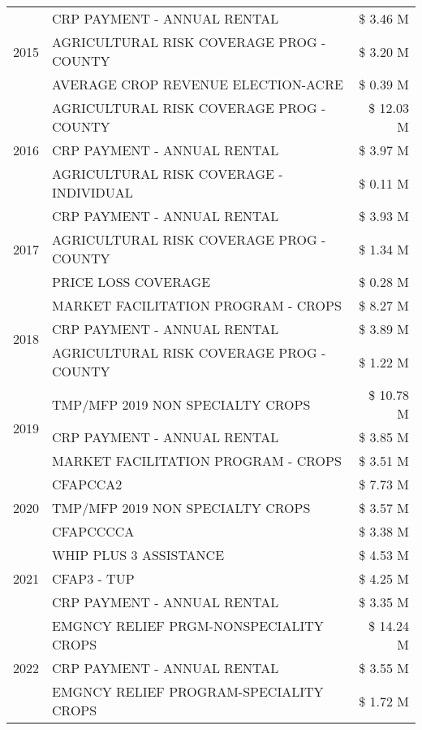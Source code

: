 \begin{tabular}{llr}
\cline{1-3}
\multirow[t]{3}{*}{2015} & CRP PAYMENT - ANNUAL RENTAL & \$ 3.46 M \\
 & AGRICULTURAL RISK COVERAGE PROG - COUNTY & \$ 3.20 M \\
 & AVERAGE CROP REVENUE ELECTION-ACRE & \$ 0.39 M \\
\cline{1-3}
\multirow[t]{3}{*}{2016} & AGRICULTURAL RISK COVERAGE PROG - COUNTY & \$ 12.03 M \\
 & CRP PAYMENT - ANNUAL RENTAL & \$ 3.97 M \\
 & AGRICULTURAL RISK COVERAGE - INDIVIDUAL & \$ 0.11 M \\
\cline{1-3}
\multirow[t]{3}{*}{2017} & CRP PAYMENT - ANNUAL RENTAL & \$ 3.93 M \\
 & AGRICULTURAL RISK COVERAGE PROG - COUNTY & \$ 1.34 M \\
 & PRICE LOSS COVERAGE & \$ 0.28 M \\
\cline{1-3}
\multirow[t]{3}{*}{2018} & MARKET FACILITATION PROGRAM - CROPS & \$ 8.27 M \\
 & CRP PAYMENT - ANNUAL RENTAL & \$ 3.89 M \\
 & AGRICULTURAL RISK COVERAGE PROG - COUNTY & \$ 1.22 M \\
\cline{1-3}
\multirow[t]{3}{*}{2019} & TMP/MFP 2019 NON SPECIALTY CROPS & \$ 10.78 M \\
 & CRP PAYMENT - ANNUAL RENTAL & \$ 3.85 M \\
 & MARKET FACILITATION PROGRAM - CROPS & \$ 3.51 M \\
\cline{1-3}
\multirow[t]{3}{*}{2020} & CFAPCCA2 & \$ 7.73 M \\
 & TMP/MFP 2019 NON SPECIALTY CROPS & \$ 3.57 M \\
 & CFAPCCCCA & \$ 3.38 M \\
\cline{1-3}
\multirow[t]{3}{*}{2021} & WHIP PLUS 3 ASSISTANCE & \$ 4.53 M \\
 & CFAP3 - TUP & \$ 4.25 M \\
 & CRP PAYMENT - ANNUAL RENTAL & \$ 3.35 M \\
\cline{1-3}
\multirow[t]{3}{*}{2022} & EMGNCY RELIEF PRGM-NONSPECIALITY CROPS & \$ 14.24 M \\
 & CRP PAYMENT - ANNUAL RENTAL & \$ 3.55 M \\
 & EMGNCY RELIEF PROGRAM-SPECIALITY CROPS & \$ 1.72 M \\
\cline{1-3}
\bottomrule
\end{tabular}
